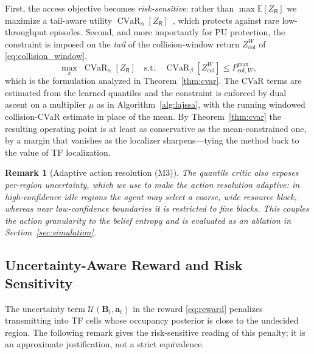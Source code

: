 \documentclass[journal]{IEEEtran}
\newtheorem{remark}{Remark}
\newcommand{\E}{\mathbb{E}}
\newcommand{\belmap}{\bm{B}}               %
\newcommand{\act}{\bm{a}}                  %
\newcommand{\pol}{\pi}                     %
\newcommand{\Zcol}{Z_{\mathrm{col}}}        %
\newcommand{\Zthru}{Z_{\mathsf{R}}}         %
\DeclareMathOperator{\CVaR}{CVaR}
\newcommand{\cvarlvl}{\alpha}               %
\newcommand{\cvarcol}{\beta}                %
\newcommand{\PcolmaxW}{P_{\mathrm{col},W}^{\max}}  %
\begin{document}
First, the access objective becomes \emph{risk-sensitive}: rather than
$\max\E[\Zthru]$ we maximize a tail-aware utility
$\CVaR_{\cvarlvl}[\Zthru]$~\cite{rockafellar2000cvar}, which protects against rare low-throughput
episodes. Second, and more importantly for PU protection, the constraint is
imposed on the \emph{tail} of the collision-window return $\Zcol^{W}$ of
\eqref{eq:collision_window},
\begin{equation}
\max_{\pol}\;\CVaR_{\cvarlvl}\!\left[\Zthru\right]
\quad\text{s.t.}\quad
\CVaR_{\cvarcol}\!\left[\Zcol^{W}\right]\le\PcolmaxW,
\label{eq:cvar_objective}
\end{equation}
which is the formulation analyzed in Theorem~\ref{thm:cvar}. The CVaR terms
are estimated from the learned quantiles and the constraint is enforced by
dual ascent on a multiplier $\mu$ as in Algorithm~\ref{alg:lajssa}, with the
running windowed collision-CVaR estimate in place of the mean. By
Theorem~\ref{thm:cvar} the resulting operating point is at least as
conservative as the mean-constrained one, by a margin that vanishes as the
localizer sharpens---tying the method back to the value of TF localization.

\begin{remark}[Adaptive action resolution (M3)]
\label{rem:m3}
The quantile critic also exposes per-region uncertainty, which we use to make
the action resolution adaptive: in high-confidence idle regions the agent may
select a coarse, wide resource block, whereas near low-confidence boundaries
it is restricted to fine blocks. This couples the action granularity to the
belief entropy and is evaluated as an ablation in
Section~\ref{sec:simulation}.
\end{remark}

\subsection{Uncertainty-Aware Reward and Risk Sensitivity}
\label{subsec:reward_shaping}
The uncertainty term $\mathcal{U}(\belmap_t,\act_t)$ in the reward
\eqref{eq:reward} penalizes transmitting into TF cells whose occupancy
posterior is close to the undecided region. The following remark gives the
risk-sensitive reading of this penalty; it is an approximate justification,
not a strict equivalence.
\end{document}

